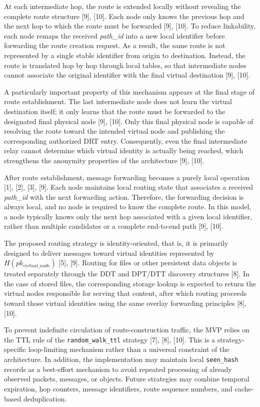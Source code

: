\documentclass[12pt,a4paper]{article}
\begin{document}
At each intermediate hop, the route is extended locally without revealing the complete route structure [9], [10]. Each node only knows the previous hop and the next hop to which the route must be forwarded [9], [10]. To reduce linkability, each node remaps the received \textit{path\_id} into a new local identifier before forwarding the route creation request. As a result, the same route is not represented by a single stable identifier from origin to destination. Instead, the route is translated hop by hop through local tables, so that intermediate nodes cannot associate the original identifier with the final virtual destination [9], [10].

A particularly important property of this mechanism appears at the final stage of route establishment. The last intermediate node does not learn the virtual destination itself; it only learns that the route must be forwarded to the designated final physical node [9], [10]. Only this final physical node is capable of resolving the route toward the intended virtual node and publishing the corresponding authorized DRT entry. Consequently, even the final intermediate relay cannot determine which virtual identity is actually being reached, which strengthens the anonymity properties of the architecture [9], [10].

After route establishment, message forwarding becomes a purely local operation [1], [2], [3], [9]. Each node maintains local routing state that associates a received \textit{path\_id} with the next forwarding action. Therefore, the forwarding decision is always local, and no node is required to know the complete route. In this model, a node typically knows only the next hop associated with a given local identifier, rather than multiple candidates or a complete end-to-end path [9], [10].

The proposed routing strategy is identity-oriented, that is, it is primarily designed to deliver messages toward virtual identities represented by $H(pk_{virtual\_node})$ [5], [9]. Routing for files or other persistent data objects is treated separately through the DDT and DPT/DTT discovery structures [8]. In the case of stored files, the corresponding storage lookup is expected to return the virtual nodes responsible for serving that content, after which routing proceeds toward those virtual identities using the same overlay forwarding principles [8], [10].

To prevent indefinite circulation of route-construction traffic, the MVP relies on the TTL rule of the \texttt{random\_walk\_ttl} strategy [7], [8], [10]. This is a strategy-specific loop-limiting mechanism rather than a universal constraint of the architecture. In addition, the implementation may maintain local \texttt{seen\_hash} records as a best-effort mechanism to avoid repeated processing of already observed packets, messages, or objects. Future strategies may combine temporal expiration, hop counters, message identifiers, route sequence numbers, and cache-based deduplication.
\end{document}
